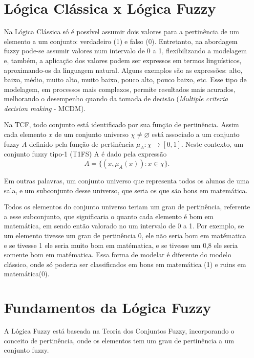 \documentclass[tcc,capa]{texufpel}
\begin{document}
\section{Lógica Clássica x Lógica Fuzzy}

Na Lógica Clássica só é possível assumir dois valores para a pertinência de um elemento a um conjunto: verdadeiro (1) e falso (0). Entretanto, na abordagem fuzzy pode-se assumir valores num intervalo de 0 a 1,  flexibilizando a modelagem e, também, a aplicação dos valores podem ser expressos em termos linguísticos, aproximando-os da linguagem natural. Alguns exemplos são as expressões: alto, baixo, médio, muito alto, muito baixo, pouco alto, pouco baixo, etc. Esse tipo de modelagem, em processos mais complexos, permite resultados mais acurados, melhorando o desempenho quando da tomada de decisão (\emph{Multiple criteria decision making} - MCDM). 

Na TCF, todo conjunto está identificado por sua função de pertinência. Assim cada elemento $x$ de um conjunto universo $\chi\neq\varnothing$ está associado a um conjunto fuzzy $A$  definido pela função de pertinência $\mu_A:\chi \rightarrow [0,1]$. Neste contexto, um conjunto fuzzy tipo-1 (T1FS) A é dado pela expressão
\begin{equation}
A= \{(x, \mu_A(x)) \colon  x \in \chi\}.
\end{equation}

Em outras palavras, um conjunto universo que representa todos os alunos de uma sala, e um subconjunto desse universo, que seria os que são bons em matemática.

Todos os elementos do conjunto universo teriam um grau de pertinência, referente a esse subconjunto, que significaria o quanto cada elemento é bom em matemática, em sendo então valorado no um intervalo de 0 a 1. Por exemplo, se um elemento tivesse um grau de pertinência 0, ele não seria bom em matématica e se tivesse 1 ele seria muito bom em matématica, e se tivesse um 0,8 ele seria somente bom em matématica. Essa forma de modelar é diferente do modelo clássico, onde só poderia ser classificados em bons em matemática (1) e ruins em matemática(0).

\section{Fundamentos da Lógica Fuzzy}

A Lógica Fuzzy está baseada na Teoria dos Conjuntos Fuzzy, incorporando o conceito de pertinência, onde os elementos tem um grau de pertinência a um conjunto fuzzy.
\end{document}
